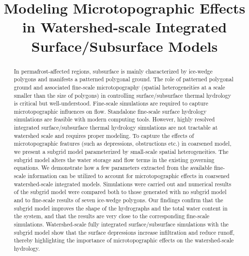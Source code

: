 \documentclass[review,11pt]{elsarticle}
\begin{document}
\begin{frontmatter}

\title{Modeling Microtopographic Effects in Watershed-scale Integrated Surface/Subsurface Models}





\begin{abstract}
In permafrost-affected regions, subsurface is mainly characterized by ice-wedge polygons and manifests a patterned polygonal ground. The role of patterned polygonal ground and associated fine-scale microtopography (spatial heterogeneities at a scale smaller than the size of polygons) in controlling surface/subsurface thermal hydrology is critical but well-understood. Fine-scale simulations are required to capture microtopographic influences on flow. Standalone fine-scale surface hydrology simulations are feasible with modern computing tools. However, highly resolved integrated surface/subsurface thermal hydrology simulations are not tractable at watershed scale and requires proper modeling. To capture the effects of microtopographic features (such as depressions, obstructions etc.) in coarsened model, we present a subgrid model parameterized by small-scale spatial heterogeneities.  The subgrid model alters the water storage and flow terms in the existing governing equations. We demonstrate how a few parameters extracted from the available fine-scale information can be utilized to account for microtopographic effects in coarsened watershed-scale integrated models.
Simulations were carried out and numerical results of the subgrid model were compared both to those generated with no subgrid model and to fine-scale results of seven ice-wedge polygons. Our findings confirm that the subgrid model improves the shape of the hydrographs and the total water content in the system, and that the results are very close to the corresponding fine-scale simulations. Watershed-scale fully integrated surface/subsurface simulations with the subgrid model show that the surface depressions increase infiltration and reduce runoff, thereby highlighting the importance of microtopographic effects on the watershed-scale hydrology.
\end{abstract}


\end{frontmatter}
\end{document}
